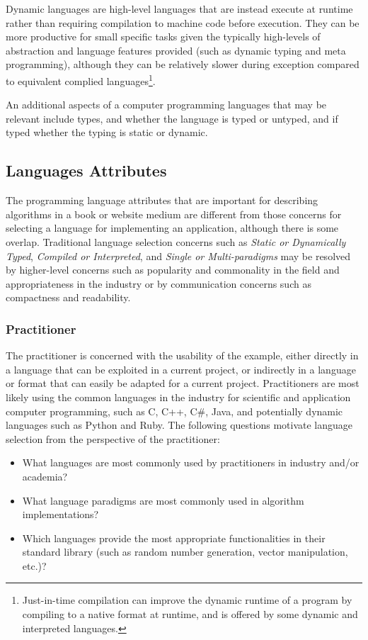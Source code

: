 \documentclass[a4paper, 11pt]{article}
\begin{document}
Dynamic languages are high-level languages that are instead execute at runtime rather than requiring compilation to machine code before execution. They can be more productive for small specific tasks given the typically high-levels of abstraction and language features provided (such as dynamic typing and meta programming), although they can be relatively slower during exception compared to equivalent complied languages\footnote{Just-in-time compilation can improve the dynamic runtime of a program by compiling to a native format at runtime, and is offered by some dynamic and interpreted languages.}.

An additional aspects of a computer programming languages that may be relevant include types, and whether the language is typed or untyped, and if typed whether the typing is static or dynamic.

% 
%
\subsection{Languages Attributes}
The programming language attributes that are important for describing algorithms in a book or website medium are different from those concerns for selecting a language for implementing an application, although there is some overlap.
Traditional language selection concerns such as \emph{Static or Dynamically Typed}, \emph{Compiled or Interpreted}, and \emph{Single or Multi-paradigms} may be resolved by higher-level concerns such as popularity and commonality in the field and appropriateness in the industry or by communication concerns such as compactness and readability.

\subsubsection{Practitioner}
The practitioner is concerned with the usability of the example, either directly in a language that can be exploited in a current project, or indirectly in a language or format that can easily be adapted for a current project. Practitioners are most likely using the common languages in the industry for scientific and application computer programming, such as C, C++, C\#, Java, and potentially dynamic languages such as Python and Ruby. The following questions motivate language selection from the perspective of the practitioner:

\begin{itemize}
	\item What languages are most commonly used by practitioners in industry and/or academia?
	\item What language paradigms are most commonly used in algorithm implementations?
	\item Which languages provide the most appropriate functionalities in their standard library (such as random number generation, vector manipulation, etc.)?
\end{itemize}
\end{document}
